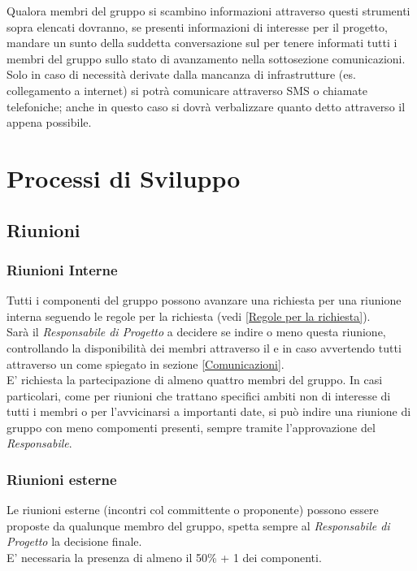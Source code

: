 \documentclass{scalatekids-article}
\begin{document}
Qualora membri del gruppo si scambino informazioni attraverso questi strumenti
sopra elencati dovranno, se presenti informazioni di interesse per il progetto,
mandare un sunto della suddetta conversazione sul  per tenere
informati tutti i membri del gruppo sullo stato di avanzamento nella
sottosezione comunicazioni.\\ Solo in caso di necessità derivate dalla mancanza
di infrastrutture (es. collegamento a internet) si potrà comunicare attraverso
SMS o chiamate telefoniche; anche in questo caso si dovrà verbalizzare quanto
detto attraverso il  appena possibile.

\section{Processi di Sviluppo}
\subsection{Riunioni}
\subsubsection{Riunioni Interne}
Tutti i componenti del gruppo possono avanzare una richiesta per una riunione
interna seguendo le regole per la richiesta (vedi \ref{Regole per la
  richiesta}).\\ Sarà il \textit{Responsabile di Progetto} a decidere se indire
o meno questa riunione, controllando la disponibilità dei membri attraverso il
 e in caso avvertendo tutti attraverso un  come
spiegato in sezione \ref{Comunicazioni}.\\ E' richiesta la partecipazione di
almeno quattro membri del gruppo. In casi particolari, come per riunioni che
trattano specifici ambiti non di interesse di tutti i membri o per l'avvicinarsi
a importanti date, si può indire una riunione di gruppo con meno compomenti
presenti, sempre tramite l'approvazione del \textit{Responsabile}.

\subsubsection{Riunioni esterne}
Le riunioni esterne (incontri col committente o proponente) possono essere
proposte da qualunque membro del gruppo, spetta sempre al \textit{Responsabile
  di Progetto} la decisione finale.\\ E' necessaria la presenza di almeno il
50\% + 1 dei componenti.
\end{document}
